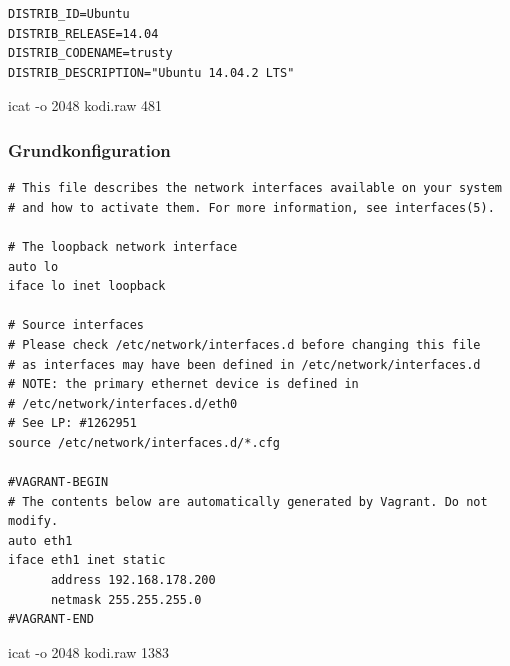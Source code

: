 \begin{cmd}[H]
\begin{verbatim}
DISTRIB_ID=Ubuntu
DISTRIB_RELEASE=14.04
DISTRIB_CODENAME=trusty
DISTRIB_DESCRIPTION="Ubuntu 14.04.2 LTS"
\end{verbatim}
\caption{icat -o 2048 kodi.raw 481}
\label{cmd:kodi-lsb}
\end{cmd}

\subsubsection{Grundkonfiguration}

\begin{cmd}[H]
\begin{verbatim}
# This file describes the network interfaces available on your system
# and how to activate them. For more information, see interfaces(5).

# The loopback network interface
auto lo
iface lo inet loopback

# Source interfaces
# Please check /etc/network/interfaces.d before changing this file
# as interfaces may have been defined in /etc/network/interfaces.d
# NOTE: the primary ethernet device is defined in
# /etc/network/interfaces.d/eth0
# See LP: #1262951
source /etc/network/interfaces.d/*.cfg

#VAGRANT-BEGIN
# The contents below are automatically generated by Vagrant. Do not modify.
auto eth1
iface eth1 inet static
      address 192.168.178.200
      netmask 255.255.255.0
#VAGRANT-END
\end{verbatim}
\caption{icat -o 2048 kodi.raw 1383}
\label{cmd:kodi-interfaces}
\end{cmd}

